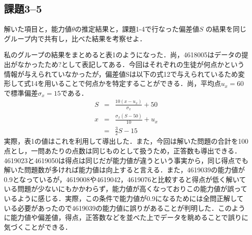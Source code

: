 \documentclass[12pt]{jarticle}
\begin{document}
\subsection{課題3–5}
\begin{shadebox}
    \quad 解いた項目と，能力値$\theta$の推定結果と，課題1-4で行なった偏差値$S$
    の結果を同じグループ内で共有し，比べた結果を考察せよ．
\end{shadebox}
\vspace{\baselineskip}
私のグループの結果をまとめると表1のようになった．尚，4618005はデータの提出がなかったため$?$として表記してある．今回はそれぞれの生徒が何点かという情報が与えられていなかったが，偏差値Sは以下の式12で与えられているため変形して式14を用いることで何点かを特定することができる．尚，平均点$u_x=60$で標準偏差$\sigma_x=15$である．
\begin{eqnarray}
    S&=&\frac{10(x-u_x)}{\sigma_x}+50\\
    x&=&\frac{\sigma_x(S-50)}{10}+u_x\\
    &=&\frac{3}{2}S-15
\end{eqnarray}
実際，表1の値はこれを利用して導出した．また，今回は解いた問題の合計を100点とし，一問あたりの点数は同じものとして扱うため，正答数も導出できる．4619023と4619050は得点は同じだが能力値が違うという事実から，同じ得点でも解いた問題数が多ければ能力値は向上すると言える．また，4619039の能力値が0.9となっているが，4619008や4619042，4619076と比較すると得点が低く解いている問題が少ないにもかかわらず，能力値が高くなっておりこの能力値が誤っているように感じる．実際，この条件で能力値が0.9になるためには全問正解している必要があったので4619039の能力値に誤りがあることが判明した．このように能力値や偏差値，得点，正答数などを並べた上でデータを眺めることで誤りに気づくことができる．
\end{document}
